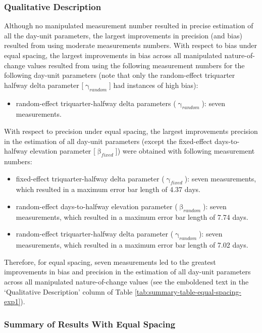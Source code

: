 \documentclass[
12pt, %
twoside,
english]{guelphthesis}
\begin{document}
\hypertarget{qualitative-equal-exp1}{%
\subsubsection{Qualitative Description}\label{qualitative-equal-exp1}}

Although no manipulated measurement number resulted in precise estimation of all the day-unit parameters, the largest improvements in precision (and bias) resulted from using moderate measurements numbers. With respect to bias under equal spacing, the largest improvements in bias across all manipulated nature-of-change values resulted from using the following measurement numbers for the following day-unit parameters (note that only the random-effect triquarter halfway delta parameter {[}\(\upgamma_{random}\){]} had instances of high bias):
\begin{itemize}
\tightlist
\item
  random-effect triquarter-halfway delta parameters (\(\upgamma_{random}\)): seven measurements.
\end{itemize}
\noindent With respect to precision under equal spacing, the largest improvements precision in the estimation of all day-unit parameters (except the fixed-effect days-to-halfway elevation parameter {[}\(\upbeta_{fixed}\){]}) were obtained with following measurement numbers:
\begin{itemize}
\tightlist
\item
  fixed-effect triquarter-halfway delta parameter (\(\upgamma_{fixed}\)): seven measurements, which resulted in a maximum error bar length of 4.37 days.
\item
  random-effect days-to-halfway elevation parameter (\(\upbeta_{random}\)): seven measurements, which resulted in a maximum error bar length of 7.74 days.
\item
  random-effect triquarter-halfway delta parameter (\(\upgamma_{random}\)): seven measurements, which resulted in a maximum error bar length of 7.02 days.
\end{itemize}
\noindent Therefore, for equal spacing, seven measurements led to the greatest improvements in bias and precision in the estimation of all day-unit parameters across all manipulated nature-of-change values (see the emboldened text in the `Qualitative Description' column of Table \ref{tab:summary-table-equal-spacing-exp1}).

\hypertarget{summary-of-results-with-equal-spacing}{%
\subsubsection{Summary of Results With Equal Spacing}\label{summary-of-results-with-equal-spacing}}
\end{document}
